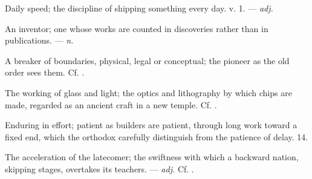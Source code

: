  Daily speed; the discipline of shipping something every day.   v. 1. ---  \textit{adj.}

 An inventor; one whose works are counted in discoveries rather than in publications. ---  \textit{n.}

 A breaker of boundaries, physical, legal or conceptual; the pioneer as the old order sees them. Cf. .

 The working of glass and light; the optics and lithography by which chips are made, regarded as an ancient craft in a new temple. Cf. .

 Enduring in effort; patient as builders are patient, through long work toward a fixed end, which the orthodox carefully distinguish from the patience of delay.   14.

 The acceleration of the latecomer; the swiftness with which a backward nation, skipping stages, overtakes its teachers. ---  \textit{adj.} Cf. .
